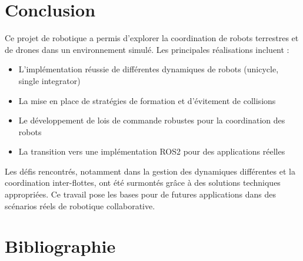 \documentclass[a4paper,12pt]{article}
\begin{document}
\section*{Conclusion}
Ce projet de robotique a permis d'explorer la coordination de robots terrestres et de drones dans un environnement simulé. Les principales réalisations incluent :

\begin{itemize}
    \item L'implémentation réussie de différentes dynamiques de robots (unicycle, single integrator)
    \item La mise en place de stratégies de formation et d'évitement de collisions
    \item Le développement de lois de commande robustes pour la coordination des robots
    \item La transition vers une implémentation ROS2 pour des applications réelles
\end{itemize}

Les défis rencontrés, notamment dans la gestion des dynamiques différentes et la coordination inter-flottes, ont été surmontés grâce à des solutions techniques appropriées. Ce travail pose les bases pour de futures applications dans des scénarios réels de robotique collaborative.

\newpage
\section*{Bibliographie}
\printbibliography[heading=none]
\end{document}
